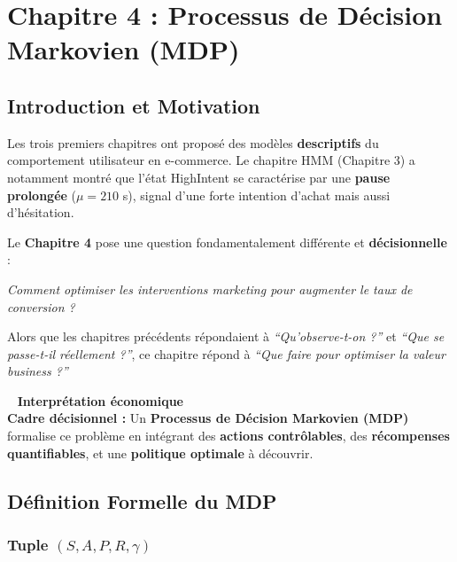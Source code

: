 \documentclass[11pt,a4paper]{article}
\newenvironment{insightbox}{%
  \vspace{3pt}\begin{framed}
  \noindent{\color{NavyBlue}\rule{0.3cm}{3pt}}~%
  \textcolor{NavyBlue}{\textbf{Interprétation économique}}\\[3pt]}
  {\end{framed}\vspace{3pt}}
\begin{document}
\newpage


 
\section{Chapitre 4 : Processus de Décision Markovien (MDP)}
 
\subsection{Introduction et Motivation}
 
Les trois premiers chapitres ont proposé des modèles \textbf{descriptifs} du
comportement utilisateur en e-commerce. Le chapitre HMM (Chapitre 3) a notamment
montré que l'état HighIntent se caractérise par une \textbf{pause prolongée}
($\mu = 210$ s), signal d'une forte intention d'achat mais aussi d'hésitation.
 
Le \textbf{Chapitre 4} pose une question fondamentalement différente et
\textbf{décisionnelle} :
 
\begin{center}
\textit{Comment optimiser les interventions marketing pour augmenter le taux de conversion ?}
\end{center}
 
Alors que les chapitres précédents répondaient à \textit{``Qu'observe-t-on ?''} et
\textit{``Que se passe-t-il réellement ?''}, ce chapitre répond à
\textit{``Que faire pour optimiser la valeur business ?''}
 
\begin{insightbox}
\textbf{Cadre décisionnel :} Un \textbf{Processus de Décision Markovien (MDP)}
formalise ce problème en intégrant des \textbf{actions contrôlables},
des \textbf{récompenses quantifiables}, et une \textbf{politique optimale} à découvrir.
\end{insightbox}
 
\subsection{Définition Formelle du MDP}
 
\subsubsection{Tuple $(S, A, P, R, \gamma)$}
 
\end{document}
